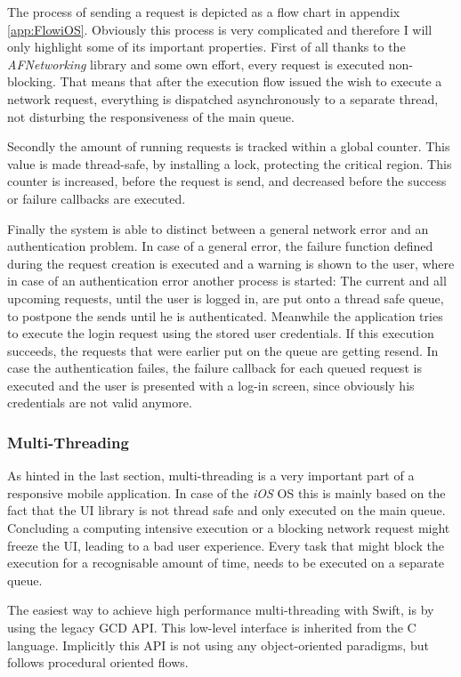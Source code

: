 The process of sending a request is depicted as a flow chart in appendix \vref{app:FlowiOS}. Obviously this process is very complicated and therefore I will only highlight some of its important properties. First of all thanks to the \emph{AFNetworking} library and some own effort, every request is executed non-blocking. That means that after the execution flow issued the wish to execute a network request, everything is dispatched asynchronously to a separate thread, not disturbing the responsiveness of the main queue.

Secondly the amount of running requests is tracked within a global counter. This value is made thread-safe, by installing a lock, protecting the critical region. This counter is increased, before the request is send, and decreased before the success or failure callbacks are executed.

Finally the system is able to distinct between a general network error and an authentication problem. In case of a general error, the failure function defined during the request creation is executed and a warning is shown to the user, where in case of an authentication error another process is started: The current and all upcoming requests, until the user is logged in, are put onto a thread safe queue, to postpone the sends until he is authenticated. Meanwhile the application tries to execute the login request using the stored user credentials. If this execution succeeds, the requests that were earlier put on the queue are getting resend. In case the authentication failes, the failure callback for each queued request is executed and the user is presented with a log-in screen, since obviously his credentials are not valid anymore. 

\subsubsection{Multi-Threading}

As hinted in the last section, multi-threading is a very important part of a responsive mobile application. In case of the \emph{iOS} \acrlong{OS} this is mainly based on the fact that the \gls{UI} library is not thread safe and only executed on the main queue. Concluding a computing intensive execution or a blocking network request might freeze the \gls{UI}, leading to a bad user experience. Every task that might block the execution for a recognisable amount of time, needs to be executed on a separate queue.

The easiest way to achieve high performance multi-threading with \gls{Swift}, is by using the legacy \gls{GCD} \gls{API}. This low-level interface is inherited from the C language. Implicitly this \gls{API} is not using any object-oriented paradigms, but follows procedural oriented flows. 

